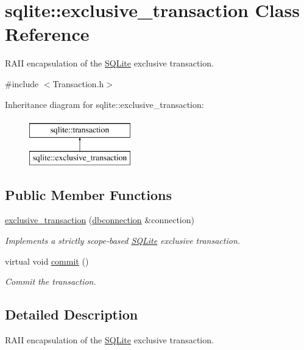 \hypertarget{a00007}{\section{sqlite\-:\-:exclusive\-\_\-transaction Class Reference}
\label{a00007}
}


R\-A\-I\-I encapsulation of the \hyperlink{a00038}{S\-Q\-Lite} exclusive transaction.  




{\ttfamily \#include $<$Transaction.\-h$>$}

Inheritance diagram for sqlite\-:\-:exclusive\-\_\-transaction\-:\begin{figure}[H]
\begin{center}
\leavevmode
\includegraphics[height=2.000000cm]{a00007}
\end{center}
\end{figure}
\subsection*{Public Member Functions}
\begin{DoxyCompactItemize}
\item 
\hyperlink{a00007_a9380f63712877dd18432ca82476dd096}{exclusive\-\_\-transaction} (\hyperlink{a00004}{dbconnection} \&connection)
\begin{DoxyCompactList}\small\item\em Implements a strictly scope-\/based \hyperlink{a00038}{S\-Q\-Lite} exclusive transaction. \end{DoxyCompactList}\item 
\hypertarget{a00014_abe219dd0bf949d569381f9830c7b2d1a}{virtual void \hyperlink{a00014_abe219dd0bf949d569381f9830c7b2d1a}{commit} ()}\label{a00014_abe219dd0bf949d569381f9830c7b2d1a}

\begin{DoxyCompactList}\small\item\em Commit the transaction. \end{DoxyCompactList}\end{DoxyCompactItemize}


\subsection{Detailed Description}
R\-A\-I\-I encapsulation of the \hyperlink{a00038}{S\-Q\-Lite} exclusive transaction. 

